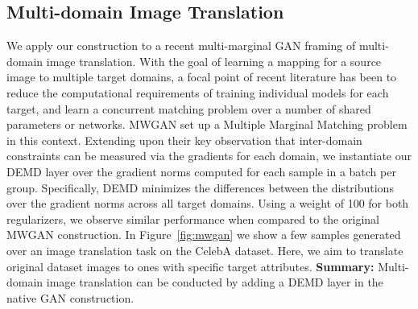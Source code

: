 \subsection{Multi-domain Image Translation}
We apply our construction to a recent multi-marginal GAN framing of multi-domain image translation.
With the goal of learning a mapping for a source image to multiple target domains, a focal point of recent literature has been to reduce the computational requirements of training individual models for each target, and learn a concurrent matching problem over a number of shared parameters or networks. MWGAN \citep{cao2019multi} set up a Multiple Marginal Matching problem in this context.
Extending upon their key observation that inter-domain constraints can be measured via the gradients for each domain,
we instantiate our DEMD layer over the gradient norms computed for each sample in a batch per group.
Specifically, DEMD minimizes the differences between the distributions over the gradient norms across all target domains.
Using a weight of 100 for both regularizers,
we observe similar performance when compared 
to the original MWGAN construction.
In Figure~\ref{fig:mwgan} we show a few samples generated over an image translation task on the CelebA dataset.
Here, we aim to translate original dataset images to ones with specific target attributes.
{\bf Summary:} Multi-domain image translation can be conducted by adding a DEMD layer in the native GAN construction. 

